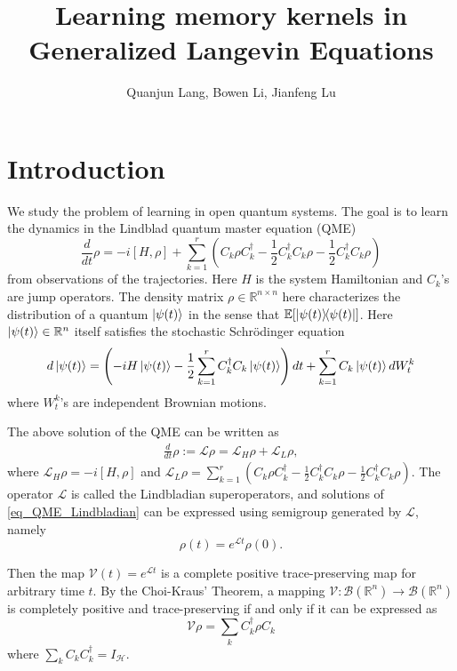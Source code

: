 \documentclass[10pt]{article}  %
\title{Learning memory kernels in Generalized Langevin Equations}
\author{Quanjun Lang, Bowen Li, Jianfeng Lu}
\date{}
\theoremstyle{plain}
\numberwithin{equation}{section}
\def\mH{\mathcal{H}}
\def\mL{\mathcal{L}}
\def\mV{\mathcal{V}}
\def\mB{\mathcal{B}}
\def\R{\mathbb{R}}
\begin{document}
\maketitle

\tableofcontents
\section{Introduction}
We study the problem of learning in open quantum systems. The goal is to learn the dynamics in the Lindblad quantum master equation (QME)
\begin{equation}\label{eq_QME_main}
	\frac{d}{dt} \rho = -i[H, \rho] + \sum_{k = 1}^r (C_k \rho C_k^\dagger - \frac{1}{2} C_k^\dagger C_k \rho - \frac{1}{2} C_k^\dagger C_k \rho)
\end{equation}
from observations of the trajectories. Here $H$ is the system Hamiltonian and $C_k$'s are jump operators. The density matrix $\rho \in \R^{n \times n}$ here characterizes the distribution of a quantum $\ket{\psi(t)}$ in the sense that $\mathbb{E}[\ketbra{\psi(t)}{\psi(t)}]$. 
Here $\ket{\psi(t)} \in \R^n$ itself satisfies the stochastic Schr\"{o}dinger equation
\begin{equation}
	d \ket{\psi(t)} = \left( -i H \ket{\psi(t)} - \frac{1}{2}\sum_{k = 1}^r C_k^\dagger C_k \ket{\psi(t)}\right) dt + \sum_{k = 1}^r C_k \ket{\psi(t)} dW^k_t
\end{equation}
where $W^k_t$'s are independent Brownian motions.


The above solution of the QME can be written as
\begin{align}\label{eq_QME_Lindbladian}
	\frac{d}{dt} \rho := \mL \rho =  \mL_H\rho + \mL_L \rho, 
\end{align}
where $\mL_H \rho = -i[H, \rho]$ and $\mL_L \rho = \sum_{k = 1}^r (C_k \rho C_k^\dagger - \frac{1}{2} C_k^\dagger C_k \rho - \frac{1}{2} C_k^\dagger C_k \rho)$. The operator $\mL$ is called the Lindbladian superoperators, and solutions of \eqref{eq_QME_Lindbladian} can be expressed using semigroup generated by $\mL$, namely
\begin{equation}
	\rho(t) = e^{\mL t}\rho(0).
\end{equation}

Then the map $\mV(t) = e^{\mL t}$ is a complete positive trace-preserving map for arbitrary time $t$. By the Choi-Kraus' Theorem, a mapping $\mV:\mB(\R^n) \to \mB(\R^n)$ is completely positive and trace-preserving if and only if it can be expressed as 
\begin{equation}
	\mV\rho = \sum_{k}C_k^\dagger \rho C_k
\end{equation}
where $\sum_{k}C_kC_k^\dagger = I_\mH$. 
\end{document}
